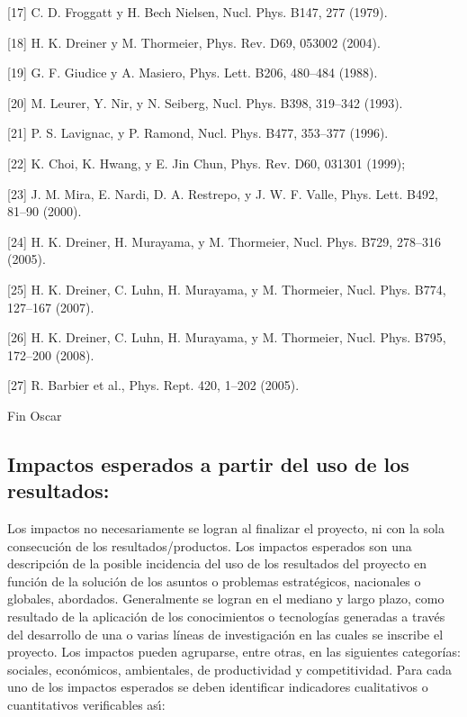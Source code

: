 [17] C. D. Froggatt y H. Bech Nielsen, Nucl. Phys. B147, 277 (1979).

[18] H. K. Dreiner y M. Thormeier, Phys. Rev. D69, 053002 (2004).

[19] G. F. Giudice y A. Masiero, Phys. Lett. B206, 480–484 (1988).

[20] M. Leurer, Y. Nir, y N. Seiberg, Nucl. Phys. B398, 319–342 (1993).

[21] P. S. Lavignac, y P. Ramond, Nucl. Phys. B477, 353–377 (1996).

[22] K. Choi, K. Hwang, y E. Jin Chun, Phys. Rev. D60, 031301 (1999);

[23] J. M. Mira, E. Nardi, D. A. Restrepo, y J. W. F. Valle, Phys. Lett. B492, 81–90 (2000).

[24] H. K. Dreiner, H. Murayama, y M. Thormeier, Nucl. Phys. B729, 278–316 (2005).

[25] H. K. Dreiner, C. Luhn, H. Murayama, y M. Thormeier, Nucl. Phys. B774, 127–167 (2007).

[26] H. K. Dreiner, C. Luhn, H. Murayama, y M. Thormeier, Nucl. Phys. B795, 172–200 (2008).

[27] R. Barbier et al., Phys. Rept. 420, 1–202 (2005). 

Fin Oscar

\subsection{Impactos esperados a partir del uso de los resultados:}

\begin{instrucciones}
  Los impactos no necesariamente se logran al finalizar el proyecto, ni
con la sola consecución de los resultados/productos. Los impactos
esperados son una descripción de la posible incidencia del uso de los
resultados del proyecto en función de la solución de los asuntos o
problemas estratégicos, nacionales o globales, abordados. Generalmente
se logran en el mediano y largo plazo, como resultado de la aplicación
de los conocimientos o tecnologías generadas a través del desarrollo
de una o varias líneas de investigación en las cuales se inscribe el
proyecto. Los impactos pueden agruparse, entre otras, en las
siguientes categorías: sociales, económicos, ambientales, de
productividad y competitividad. Para cada uno de los impactos
esperados se deben identificar indicadores cualitativos o
cuantitativos verificables as\'\i:
\end{instrucciones}


